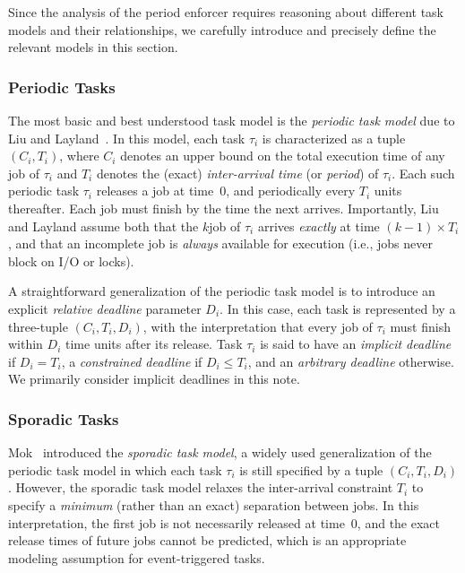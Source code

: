Since the analysis of the period enforcer requires reasoning about different task models and their relationships, we carefully introduce and precisely define the relevant models in this section.


\subsubsection{Periodic Tasks}

The most basic and best understood task model is the \emph{periodic task model} due to Liu and Layland~\cite{LL:73}. In this model, each task $\tau_i$ is characterized as a tuple $(C_i,T_i)$, where $C_i$ denotes an upper bound on the total execution time of any job of $\tau_i$ and $T_i$ denotes the (exact) \emph{inter-arrival time} (or \emph{period}) of $\tau_i$. Each such periodic task $\tau_i$ releases a job at time~0, and periodically every $T_i$ units thereafter. Each job must finish by the time the next arrives. Importantly, Liu and Layland assume both that the $k$\xth job of $\tau_i$ arrives \emph{exactly} at time $(k-1)\times T_i$, and that an incomplete job is \emph{always} available for execution (i.e., jobs never block on I/O or locks).

A straightforward generalization of the periodic task model is to introduce an explicit \emph{relative deadline} parameter $D_i$. In this case, each task is represented by a three-tuple $(C_i, T_i, D_i)$, with the interpretation that every job of $\tau_i$ must finish within $D_i$ time units after its release. Task $\tau_i$ is said to have an \emph{implicit deadline}  if $D_i = T_i$, a \emph{constrained deadline} if $D_i \leq T_i$, and an \emph{arbitrary deadline} otherwise. We primarily consider implicit deadlines in this note.

\subsubsection{Sporadic Tasks}

Mok~\cite{Mo:83} introduced the \emph{sporadic task model}, a widely used generalization of the periodic task model in which each task $\tau_i$ is still specified by a tuple $(C_i, T_i, D_i)$. However, the sporadic task model relaxes the inter-arrival constraint $T_i$ to specify a \emph{minimum} (rather than an exact) separation between jobs. In this interpretation, the first job is not necessarily released at time~0, and the exact release times of future jobs cannot be predicted, which is an appropriate modeling assumption for event-triggered tasks.

